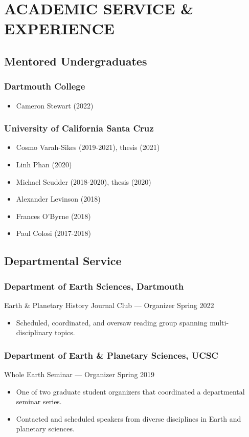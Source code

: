\documentclass[10pt]{article}
\begin{document}
\section*{ACADEMIC SERVICE \& EXPERIENCE}

\subsection*{\textbf{Mentored Undergraduates}}
\subsubsection*{Dartmouth College}
\begin{itemize}
	\item Cameron Stewart (2022)
\end{itemize}

\subsubsection*{University of California Santa Cruz}
\begin{itemize}
	\item Cosmo Varah-Sikes (2019-2021), thesis (2021)
	\item Linh Phan (2020)
	\item Michael Scudder (2018-2020), thesis (2020)
	\item Alexander Levinson (2018)
	\item Frances O'Byrne (2018)
	\item Paul Colosi (2017-2018)
\end{itemize}

\subsection*{\textbf{Departmental Service}}
\subsubsection*{Department of Earth Sciences, Dartmouth}
Earth \& Planetary History Journal Club --- Organizer 	 \hfill	Spring 2022
\begin{itemize}
	\item Scheduled, coordinated, and oversaw reading group spanning multi-disciplinary topics.
\end{itemize}

\subsubsection*{Department of Earth \& Planetary Sciences, UCSC}
Whole Earth Seminar --- Organizer \hfill  Spring 2019
\begin{itemize}
	\item One of two graduate student organizers that coordinated a departmental seminar series.
	\item Contacted and scheduled speakers from diverse disciplines in Earth and planetary sciences.
\end{itemize}
\end{document}
